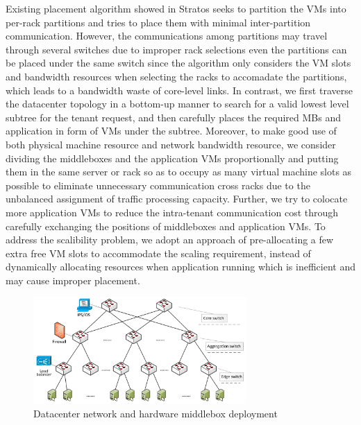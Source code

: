 \documentclass[review]{elsarticle}
\begin{document}
Existing placement algorithm showed in Stratos \cite{stratos12} seeks to partition the VMs into per-rack partitions and tries to place them with minimal inter-partition communication. However, the communications among partitions may travel through several switches due to improper rack selections even the partitions can be placed under the same switch since the algorithm only considers the VM slots and bandwidth resources when selecting the racks to accomadate the partitions, which leads to a bandwidth waste of core-level links.  
In contrast, %
we first traverse the datacenter topology in a bottom-up manner to search for a valid lowest level subtree \cite{B11tpd} for the tenant request, and then carefully places the required MBs and application in form of VMs under the subtree. 
Moreover, to make good use of both physical machine resource and network bandwidth resource, we consider dividing the middleboxes and the application VMs proportionally and putting them in the same server or rack so as to occupy as many virtual machine slots as possible to eliminate unnecessary communication cross racks due to the unbalanced assignment of traffic processing capacity. Further, we try to colocate more application VMs to reduce the intra-tenant communication cost through carefully exchanging the positions of middleboxes and application VMs.
To address the scalibility problem, we adopt an approach of pre-allocating a few extra free VM slots to accommodate the scaling requirement,  instead of dynamically allocating resources when application running which is inefficient and may cause improper placement. 


\begin{figure}
	\centering
		\includegraphics[width=3.2in]{fig/topology.pdf}
	\caption{Datacenter network and hardware middlebox deployment}
	\label{fig:topo}
\end{figure}
\end{document}
